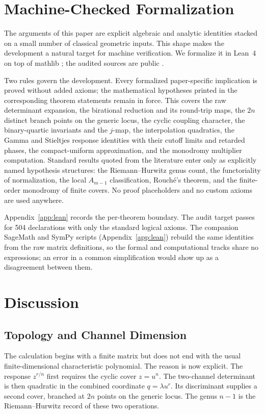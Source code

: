 \documentclass[11pt,reqno]{amsart}
\theoremstyle{remark}
\begin{document}
\section{Machine-Checked Formalization}\label{sec:formalization}

The arguments of this paper are explicit algebraic and analytic identities
stacked on a small number of classical geometric inputs.  This shape makes
the development a natural target for machine verification.  We formalize it
in Lean~4 \cite{lean4} on top of mathlib \cite{mathlib}; the audited sources
are public \cite{leanformalizations}.

Two rules govern the development.  Every formalized paper-specific
implication is proved without added axioms; the mathematical hypotheses
printed in the corresponding theorem statements remain in force.  This
covers the raw determinant
expansion, the birational reduction and its round-trip maps, the $2n$
distinct branch points on the generic locus, the cyclic coupling character,
the binary-quartic invariants and the $j$-map, the interpolation
quadratics, the Gamma and Stieltjes response identities with their cutoff
limits and retarded phases, the compact-uniform approximation, and the
monodromy multiplier computation.  Standard results quoted from the
literature enter only as explicitly named hypothesis structures: the
Riemann--Hurwitz genus count, the functoriality of normalization, the local
$A_{m-1}$ classification, Rouch\'e's theorem, and the finite-order
monodromy of finite covers.  No proof placeholders and no custom axioms are
used anywhere.

Appendix~\ref{app:lean} records the per-theorem boundary.  The audit target
passes for 504 declarations with only the standard logical axioms.  The
companion SageMath and SymPy scripts (Appendix~\ref{app:lean}) rebuild the
same identities from the raw matrix definitions, so the formal and
computational tracks share no expressions; an error in a common
simplification would show up as a disagreement between them.

\section{Discussion}\label{sec:discussion}

\subsection{Topology and Channel Dimension}

The calculation begins with a finite matrix but does not end with the usual
finite-dimensional characteristic polynomial.  The reason is now explicit.
The response $z^{r/n}$ first requires the cyclic cover $z=u^n$.  The
two-channel determinant is then quadratic in the combined coordinate
$q=\lambda u^r$.  Its discriminant supplies a second cover, branched at
$2n$ points on the generic locus.  The genus $n-1$ is the Riemann--Hurwitz
record of these two operations.
\end{document}
